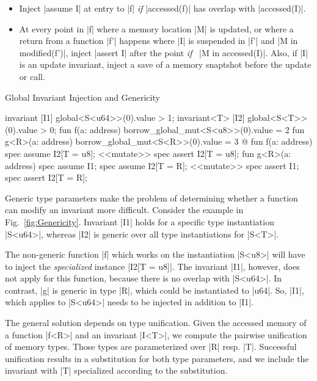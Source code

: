 \begin{itemize}
\item Inject |assume I| at entry to |f| \emph{if} |accessed(f)| has overlap with
  |accessed(I)|.
\item At every point in |f| where a memory location |M| is updated, or where a
  return from a function |f'| happens where |I| is suspended in |f'|
  and |M in modified(f')|,
  inject |assert I| after the point \emph{if}~%
  |M in accessed(I)|. Also, if |I| is an update invariant, inject a save of
  a memory snaptshot before the update or call.
\end{itemize}

\vspace{-1ex}

\begin{Figure}
  \caption{Global Invariant Injection and Genericity}
  \label{fig:Genericity}
  \centering
\begin{MoveBox}
  invariant [I1] global<S<u64>>(0).value > 1;
  invariant<T> [I2] global<S<T>>(0).value > 0;
  fun f(a: address) { borrow_global_mut<S<u8>>(0).value = 2 }
  fun g<R>(a: address) { borrow_global_mut<S<R>>(0).value = 3 }
  @\transform@
  fun f(a: address) {
    spec assume I2[T = u8];
    <<mutate>>
    spec assert I2[T = u8];
  }
  fun g<R>(a: address) {
    spec assume I1; spec assume I2[T = R];
    <<mutate>>
    spec assert I1; spec assert I2[T = R];
  }
\end{MoveBox}
\end{Figure}

Generic type parameters make the problem of determining whether a function can
modify an invariant more difficult.  Consider the example in
Fig.~\ref{fig:Genericity}. Invariant |I1| holds for a specific type
instantiation |S<u64>|, whereas |I2| is generic over all type instantiations for
|S<T>|.

The non-generic function |f| which works on the instantiation |S<u8>| will have
to inject the \emph{specialized} instance |I2[T = u8]|. The invariant |I1|,
however, does not apply for this function, because there is no overlap with
|S<u64>|.  In contrast, |g| is generic in type |R|, which could be instantiated
to |u64|. So, |I1|, which applies to |S<u64>| needs to be injected
in addition to |I1|.

The general solution depends on type unification.  Given the accessed memory of
a function |f<R>| and an invariant |I<T>|, we compute the pairwise unification
of memory types. Those types are parameterized over |R| resp. |T|. Successful
unification results in a substitution for both type parameters, and we include
the invariant with |T| specialized according to the substitution.

